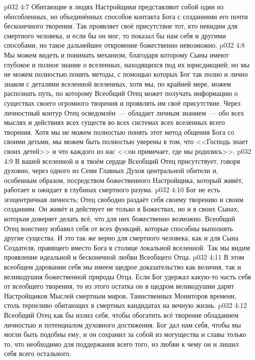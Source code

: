 \vs p032 4:7 Обитающие в людях Настройщики представляют собой один из обособленных, но объединённых способов контакта Бога с созданиями его почти бесконечного творения. Так проявляет своё присутствие тот, кто невидим для смертного человека, и если бы он мог, то показал бы нам себя и другими способами, но такое дальнейшее откровение божественно невозможно.
\vs p032 4:8 Мы можем видеть и понимать механизм, благодаря которому Сыны имеют глубокое и полное знание о вселенных, находящихся под их юрисдикцией; но мы не можем полностью понять методы, с помощью которых Бог так полно и лично знаком с деталями вселенной вселенных, хотя мы, по крайней мере, можем распознать путь, по которому Всеобщий Отец может получать информацию о существах своего огромного творения и проявлять им своё присутствие. Через личностный контур Отец осведомлён~--- обладает личным знанием~--- обо всех мыслях и действиях всех существ во всех системах всех вселенных всего творения. Хотя мы не можем полностью понять этот метод общения Бога со своими детьми, мы можем быть полностью уверены в том, что <<Господь знает своих детей>> и что каждого из нас <<он примечает, где мы родились>>.
\vs p032 4:9 \pc В вашей вселенной и в твоём сердце Всеобщий Отец присутствует, говоря духовно, через одного из Семи Главных Духов центральной обители и, особенным образом, посредством божественного Настройщика, который живёт, работает и ожидает в глубинах смертного разума.
\vs p032 4:10 \pc Бог не есть эгоцентричная личность; Отец свободно раздаёт себя своему творению и своим созданиям. Он живёт и действует не только в Божествах, но и в своих Сынах, которым доверяет делать всё, что для них божественно возможно. Всеобщий Отец воистину избавил себя от всех функций, которые способны выполнять другие существа. И это так же верно для смертного человека, как и для Сына Создателя, правящего вместо Бога в столице локальной вселенной. Так мы видим проявление идеальной и бесконечной любви Всеобщего Отца.
\vs p032 4:11 В этом всеобщем даровании себя мы имеем щедрое доказательство как величия, так и великодушия божественной природы Отца. Если Бог удержал какую\hyp{}то часть себя от всеобщего творения, то из этого остатка он в щедром великодушии дарит Настройщиков Мыслей смертным миров, Таинственных Мониторов времени, столь терпеливо обитающих в смертных кандидатах на вечную жизнь.
\vs p032 4:12 Всеобщий Отец как бы излил себя, чтобы обогатить всё творение обладанием личностью и потенциалом духовного достижения. Бог дал нам себя, чтобы мы могли быть подобны ему, и он сохранил за собой из могущества и славы только то, что необходимо для поддержания всего того, из любви к чему он и лишил себя всего остального.
